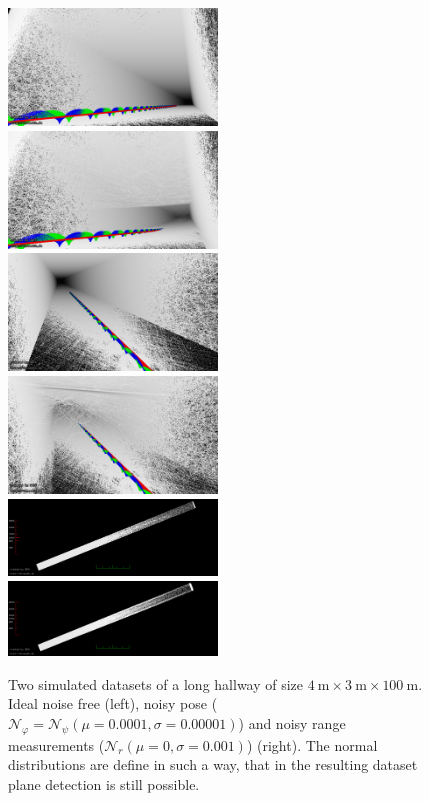 \documentclass[5p]{elsarticle}
\begin{document}
\begin{figure}
	\centering
	\includegraphics[width=0.495\textwidth]{images/perfect_bottom}\hfill
	\includegraphics[width=0.495\textwidth]{images/noisy_pose_and_range_bottom}\\
	\includegraphics[width=0.495\textwidth]{images/perfect_top}\hfill
	\includegraphics[width=0.495\textwidth]{images/noisy_pose_and_range_top}\\
	\includegraphics[width=0.495\textwidth]{images/perfect_top_view}\hfill
	\includegraphics[width=0.495\textwidth, height=0.1825\textwidth]{images/noisy_pose_and_range_top_view}
	\caption{Two simulated datasets of a long hallway of size $\SI{4}{\meter}\times\SI{3}{\meter}\times\SI{100}{\meter}$. Ideal noise free (left), noisy pose ($\mathcal{N}_\varphi = \mathcal{N}_\psi(\mu = 0.0001, \sigma= 0.00001)$) and noisy range measurements ($\mathcal{N}_r(\mu = 0, \sigma = 0.001)$) (right). 
	The normal distributions are define in such a way, that in the resulting dataset plane detection is still possible.}
	\label{fig:simulatedDatasets}
\end{figure}
\end{document}
